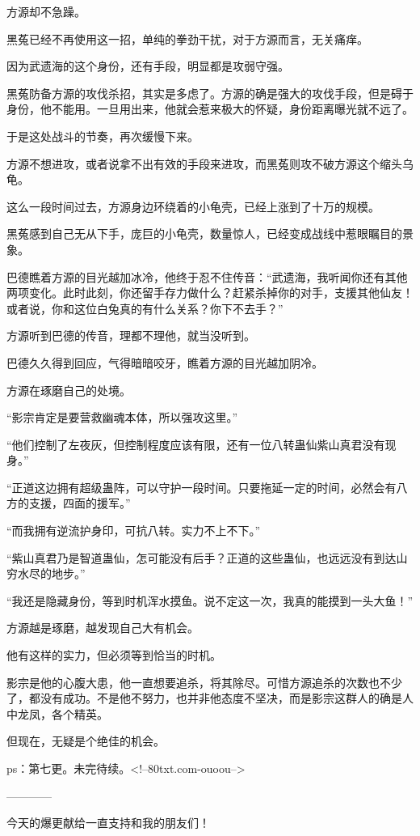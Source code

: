 \begin{this_body}
方源却不急躁。

黑菟已经不再使用这一招，单纯的拳劲干扰，对于方源而言，无关痛痒。

因为武遗海的这个身份，还有手段，明显都是攻弱守强。

黑菟防备方源的攻伐杀招，其实是多虑了。方源的确是强大的攻伐手段，但是碍于身份，他不能用。一旦用出来，他就会惹来极大的怀疑，身份距离曝光就不远了。

于是这处战斗的节奏，再次缓慢下来。

方源不想进攻，或者说拿不出有效的手段来进攻，而黑菟则攻不破方源这个缩头乌龟。

这么一段时间过去，方源身边环绕着的小龟壳，已经上涨到了十万的规模。

黑菟感到自己无从下手，庞巨的小龟壳，数量惊人，已经变成战线中惹眼瞩目的景象。

巴德瞧着方源的目光越加冰冷，他终于忍不住传音：“武遗海，我听闻你还有其他两项变化。此时此刻，你还留手存力做什么？赶紧杀掉你的对手，支援其他仙友！或者说，你和这位白兔真的有什么关系？你下不去手？”

方源听到巴德的传音，理都不理他，就当没听到。

巴德久久得到回应，气得暗暗咬牙，瞧着方源的目光越加阴冷。

方源在琢磨自己的处境。

“影宗肯定是要营救幽魂本体，所以强攻这里。”

“他们控制了左夜灰，但控制程度应该有限，还有一位八转蛊仙紫山真君没有现身。”

“正道这边拥有超级蛊阵，可以守护一段时间。只要拖延一定的时间，必然会有八方的支援，四面的援军。”

“而我拥有逆流护身印，可抗八转。实力不上不下。”

“紫山真君乃是智道蛊仙，怎可能没有后手？正道的这些蛊仙，也远远没有到达山穷水尽的地步。”

“我还是隐藏身份，等到时机浑水摸鱼。说不定这一次，我真的能摸到一头大鱼！”

方源越是琢磨，越发现自己大有机会。

他有这样的实力，但必须等到恰当的时机。

影宗是他的心腹大患，他一直想要追杀，将其除尽。可惜方源追杀的次数也不少了，都没有成功。不是他不努力，也并非他态度不坚决，而是影宗这群人的确是人中龙凤，各个精英。

但现在，无疑是个绝佳的机会。

ps：第七更。未完待续。<!--80txt.com-ouoou-->

------------

今天的爆更献给一直支持和我的朋友们！


\end{this_body}
